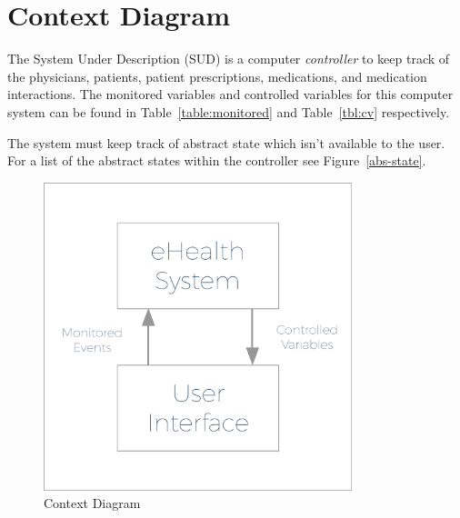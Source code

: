 \section{Context Diagram}
 
The System Under Description (SUD) is a computer \emph{controller} to keep track of the physicians, patients, patient prescriptions, medications, and medication interactions. The monitored variables and controlled variables for this computer system can be found in Table~\ref{table:monitored} and Table~\ref{tbl:cv} respectively.

The system must keep track of abstract state which isn't available to the user. For a list of the abstract states within the controller see Figure~\ref{abs-state}.

\begin{figure}[htb]
\begin{center}
\includegraphics[width=0.8\textwidth]{pics/ContextDiagramExpanded.pdf}
\end{center}
\caption{Context Diagram}
\label{fig:modes}
\end{figure}